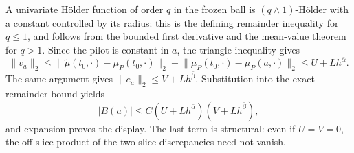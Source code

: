A univariate Hölder function of order \(q\) in the frozen ball is \((q\wedge1)\)-Hölder with a constant controlled by its radius: this is the defining remainder inequality for \(q\le1\), and follows from the bounded first derivative and the mean-value theorem for \(q>1\). Since the pilot is constant in \(a\), the triangle inequality gives
\[
\lVert v_a\rVert_2
\le\lVert\widetilde\mu(t_0,\cdot)-\mu_P(t_0,\cdot)\rVert_2
+\lVert\mu_P(t_0,\cdot)-\mu_P(a,\cdot)\rVert_2
\le U+Lh^{\bar\alpha}.
\]
The same argument gives \(\lVert e_a\rVert_2\le V+Lh^{\bar\beta}\). Substitution into the exact remainder bound yields
\[
\lvert B(a)\rvert
\le C(U+Lh^{\bar\alpha})(V+Lh^{\bar\beta}),
\]
and expansion proves the display. The last term is structural: even if \(U=V=0\), the off-slice product of the two slice discrepancies need not vanish.